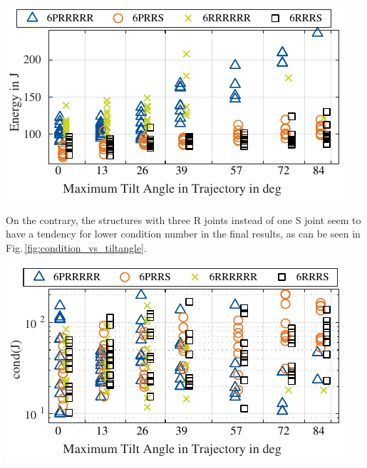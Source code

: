 \documentclass[fleqn,a4paper,10pt]{article}
\renewenvironment{figure}
  {\par\vspace{6pt}\noindent\minipage{\linewidth}}
  {\endminipage\par\vspace{6pt}}
\begin{document}
\begin{multicols}{2}
\begin{figure}
\centering
\includegraphics{./Bilder/figure_energy_vs_tiltangle.pdf}
\vspace{-0.4cm} %
\label{fig:energy_vs_tiltangle}
\end{figure}

On the contrary, the structures with three R joints instead of one S joint seem to have a tendency for lower condition number in the final results, as can be seen in Fig.\,\ref{fig:condition_vs_tiltangle}.

\begin{figure}
\centering
\includegraphics{./Bilder/figure_condition_vs_tiltangle.pdf}
\vspace{-0.4cm} %
\label{fig:condition_vs_tiltangle}
\end{figure}




\end{multicols}
\end{document}
